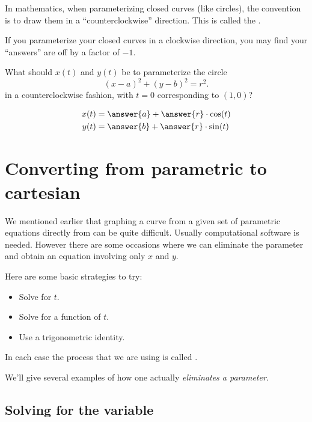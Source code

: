 \documentclass{ximera}
\begin{document}
In mathematics, when parameterizing closed curves (like circles), the
convention is to draw them in a ``counterclockwise'' direction. This
is called the .

\begin{warning}
  If you parameterize your closed curves in a clockwise direction, you
  may find your ``answers'' are off by a factor of $-1$.
\end{warning}

\begin{question}
What should $x(t)$ and $y(t)$ be to parameterize the circle
\[
(x-a)^2 + (y-b)^2 = r^2.
\]
in a counterclockwise fashion, with $t=0$ corresponding to $(1,0)$?
\begin{prompt}
  \begin{align*}
    x(t) &= \answer{a} + \answer{r}\cdot \cos(t)\\
    y(t) &= \answer{b} + \answer{r}\cdot \sin(t)
  \end{align*}
\end{prompt}
\end{question}




\section{Converting from parametric to cartesian }

We mentioned earlier that graphing a curve from a  given set of parametric equations directly from can be quite difficult. Usually computational software is needed. However there are some occasions where we can eliminate the parameter and obtain an equation involving only $x$ and $y$.

Here are some basic strategies to try:
\begin{itemize}
\item Solve for $t$.
\item Solve for a function of $t$.
\item Use a trigonometric identity.
\end{itemize}
In each case the process that we are using is called
.

We'll give several examples of how one actually \textit{eliminates a
  parameter}.

\subsection{Solving for the variable}
\end{document}
